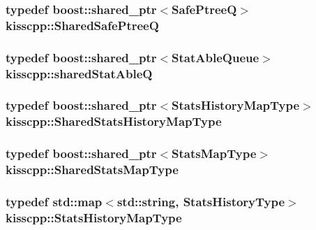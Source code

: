 \hypertarget{namespacekisscpp_ae95e969e7f5dfd1f36842ac9aa25c7ea}{
\subsubsection[{Shared\-Safe\-Ptree\-Q}]{\setlength{\rightskip}{0pt plus 5cm}typedef boost\-::shared\-\_\-ptr$<${\bf Safe\-Ptree\-Q}$>$ {\bf kisscpp\-::\-Shared\-Safe\-Ptree\-Q}}}\label{namespacekisscpp_ae95e969e7f5dfd1f36842ac9aa25c7ea}
\hypertarget{namespacekisscpp_a141592ccd82280d2692ca3b9b490faab}{
\subsubsection[{shared\-Stat\-Able\-Q}]{\setlength{\rightskip}{0pt plus 5cm}typedef boost\-::shared\-\_\-ptr$<${\bf Stat\-Able\-Queue}$>$ {\bf kisscpp\-::shared\-Stat\-Able\-Q}}}\label{namespacekisscpp_a141592ccd82280d2692ca3b9b490faab}
\hypertarget{namespacekisscpp_afa626c76d3dca5d5e1be4146f211fefa}{
\subsubsection[{Shared\-Stats\-History\-Map\-Type}]{\setlength{\rightskip}{0pt plus 5cm}typedef boost\-::shared\-\_\-ptr$<${\bf Stats\-History\-Map\-Type}$>$ {\bf kisscpp\-::\-Shared\-Stats\-History\-Map\-Type}}}\label{namespacekisscpp_afa626c76d3dca5d5e1be4146f211fefa}
\hypertarget{namespacekisscpp_aec223e8bce5f3988c62ceb0ccad11a68}{
\subsubsection[{Shared\-Stats\-Map\-Type}]{\setlength{\rightskip}{0pt plus 5cm}typedef boost\-::shared\-\_\-ptr$<${\bf Stats\-Map\-Type}$>$ {\bf kisscpp\-::\-Shared\-Stats\-Map\-Type}}}\label{namespacekisscpp_aec223e8bce5f3988c62ceb0ccad11a68}
\hypertarget{namespacekisscpp_a8dbb864ea5d1e1fae0d3a1435bd295e7}{
\subsubsection[{Stats\-History\-Map\-Type}]{\setlength{\rightskip}{0pt plus 5cm}typedef std\-::map$<$std\-::string, {\bf Stats\-History\-Type}$>$ {\bf kisscpp\-::\-Stats\-History\-Map\-Type}}}\label{namespacekisscpp_a8dbb864ea5d1e1fae0d3a1435bd295e7}
